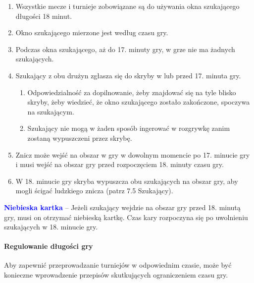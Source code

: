 \documentclass[12pt]{article}
\newcommand\bluecard[1]{\bgroup\textcolor{blue}{\textbf{#1}}}
\begin{document}
\begin{enumerate}
	\item Wszystkie mecze i turnieje zobowiązane są do używania okna
	      szukającego długości 18 minut.

	\item Okno szukającego mierzone jest według czasu gry.

	\item Podczas okna szukającego, aż do 17. minuty gry, w grze nie ma żadnych
	      szukających.

	\item Szukający z obu drużyn zgłasza się do skryby w lub przed 17. minuta
	      gry.
	      \begin{enumerate}
		      \item Odpowiedzialność za dopilnowanie, żeby znajdować się na tyle blisko
		            skryby, żeby wiedzieć, że okno szukającego zostało zakończone, spoczywa
		            na szukającym.

		      \item Szukający nie mogą w żaden sposób ingerować w rozgrywkę zanim
		            zostaną wypuszczeni przez skrybę.
	      \end{enumerate}

	\item Znicz może wejść na obszar w gry w dowolnym momencie po 17. minucie
	      gry i musi wejść na obszar gry przed rozpoczęciem 18. minuty czasu gry.

	\item W 18. minucie gry skryba wypuszcza obu szukających na obszar gry, aby
	      mogli ścigać ludzkiego znicza (patrz 7.5 Szukający).
\end{enumerate}

\bluecard{Niebieska kartka} -- Jeżeli szukający wejdzie na obszar gry przed
18. minutą gry, musi on otrzymać niebieską kartkę. Czas kary rozpoczyna
się po uwolnieniu szukających w 18. minucie gry.

\paragraph{Regulowanie długości gry}
Aby zapewnić
przeprowadzanie turniejów w odpowiednim czasie, może być konieczne
wprowadzenie przepisów skutkujących ograniczeniem czasu gry.
\end{document}
